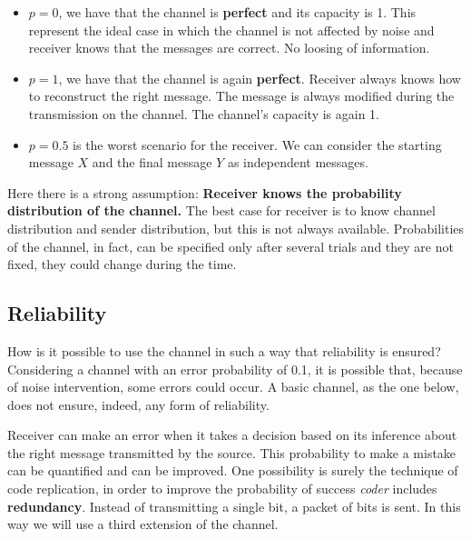 \begin{itemize}
	\item $p = 0$, we have that the channel is \textbf{perfect} and its capacity is 1. This represent the ideal case in which the channel is not affected by noise and receiver knows that the messages are correct. No loosing of information.
	
	\item $p = 1$, we have that the channel is again \textbf{perfect}. Receiver always knows how to reconstruct the right message. The message is always modified during the transmission on the channel. The channel's capacity is again 1.
	
	\item $p=0.5$ is the worst scenario for the receiver. We can consider the starting message $X$ and the final message $Y$ as independent messages.
\end{itemize}
Here there is a strong assumption: \textbf{Receiver knows the probability distribution of the channel.}
The best case for receiver is to know channel distribution and sender distribution, but this is not always available.
Probabilities of the channel, in fact, can be specified only after several trials and they are not fixed, they could change during the time.

\subsection{Reliability}
How is it possible to use the channel in such a way that reliability is ensured?\\
Considering a channel with an error probability of 0.1, it is possible that, because of noise intervention, some errors could occur. A basic channel, as the one below, does not ensure, indeed, any form of reliability.

Receiver can make an error when it takes a decision based on its inference about the right message transmitted by the source. This probability to make a mistake can be quantified and can be improved. One possibility is surely the technique of code replication, in order to improve the probability of success \textit{coder} includes \textbf{redundancy}. Instead of transmitting a single bit, a packet of bits is sent. In this way we will use a third extension of the channel.

